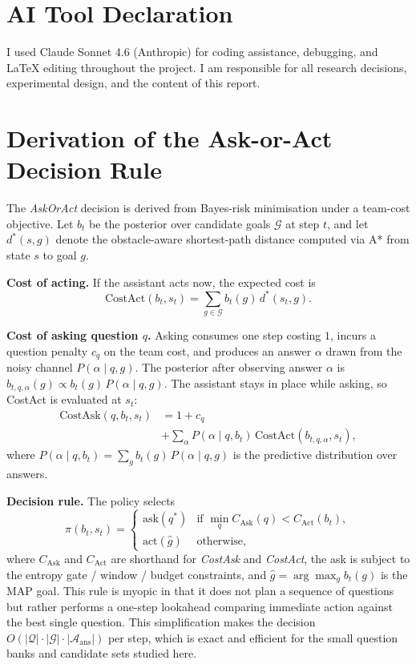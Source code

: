\documentclass[10pt,twocolumn]{article}
\begin{document}
\section*{AI Tool Declaration}
I used Claude Sonnet 4.6 (Anthropic) for coding assistance, debugging, and LaTeX editing throughout the project. I am responsible for all research decisions, experimental design, and the content of this report.

{\small


}

\appendix

\section{Derivation of the Ask-or-Act Decision Rule}
\label{app:derivation}

The \textit{AskOrAct} decision is derived from Bayes-risk minimisation under a team-cost objective.
Let $b_t$ be the posterior over candidate goals $\mathcal{G}$ at step $t$, and let $d^*(s, g)$ denote the obstacle-aware shortest-path distance computed via A* from state $s$ to goal $g$.

\textbf{Cost of acting.}
If the assistant acts now, the expected cost is
\[
  \text{CostAct}(b_t, s_t) = \sum_{g \in \mathcal{G}} b_t(g)\,d^*(s_t, g).
\]

\textbf{Cost of asking question $q$.}
Asking consumes one step costing $1$, incurs a question penalty $c_q$ on the team cost, and produces an answer $\alpha$ drawn from the noisy channel $P(\alpha \mid q, g)$.
The posterior after observing answer $\alpha$ is $b_{t,q,\alpha}(g) \propto b_t(g)\,P(\alpha \mid q, g)$. The assistant stays in place while asking, so CostAct is evaluated at $s_t$:
\begin{align*}
  \text{CostAsk}(q, b_t, s_t) &= 1 + c_q \\
    &+ \textstyle\sum_{\alpha} P(\alpha \mid q, b_t)\,\text{CostAct}(b_{t,q,\alpha}, s_t),
\end{align*}
where $P(\alpha \mid q, b_t) = \sum_g b_t(g)\,P(\alpha \mid q, g)$ is the predictive distribution over answers.

\textbf{Decision rule.}
The policy selects
\[
  \pi(b_t, s_t) = \begin{cases}
    \mathrm{ask}(q^*) & \text{if } \min_q C_{\mathrm{Ask}}(q) < C_{\mathrm{Act}}(b_t),\\
    \mathrm{act}(\hat{g}) & \text{otherwise,}
  \end{cases}
\]
where $C_{\mathrm{Ask}}$ and $C_{\mathrm{Act}}$ are shorthand for \textit{CostAsk} and \textit{CostAct}, the ask is subject to the entropy gate / window / budget constraints, and $\hat{g} = \arg\max_g b_t(g)$ is the MAP goal.
This rule is myopic in that it does not plan a sequence of questions but rather performs a one-step lookahead comparing immediate action against the best single question.
This simplification makes the decision $O(|\mathcal{Q}| \cdot |\mathcal{G}| \cdot |\mathcal{A}_{\text{ans}}|)$ per step, which is exact and efficient for the small question banks and candidate sets studied here.
\end{document}
